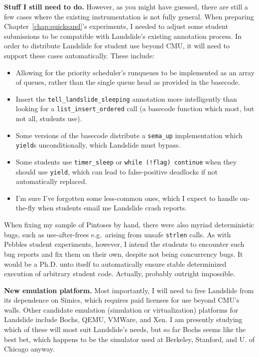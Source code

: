 {\bf Stuff I still need to do.}
However, as you might have guessed, there are still a few cases where the existing instrumentation is not fully general.
When preparing Chapter~\ref{chap:quicksand}'s experiments, I needed to adjust some student submissions to be compatible with Landslide's existing annotation process.
In order to distribute Landslide for student use beyond CMU, it will need to support these cases automatically.
These include:
\begin{itemize}
	\item Allowing for the priority scheduler's runqueues to be implemented as an array of queues, rather than the single queue head as provided in the basecode.
	\item Insert the {\tt tell\_landslide\_sleeping} annotation more intelligently than looking for a {\tt list\_insert\_ordered} call (a basecode function which most, but not all, students use).
	\item Some versions of the basecode distribute a {\tt sema\_up} implementation which {\tt yield}s unconditionally, which Landslide must bypass.
	\item Some students use {\tt timer\_sleep} or {\tt while (!flag) continue} when they should use {\tt yield}, which can lead to false-positive deadlocks if not automatically replaced.
	\item I'm sure I've forgotten some less-common ones, which I expect to handle on-the-fly when students email me Landslide crash reports.
\end{itemize}
When fixing my sample of Pintoses by hand, there were also myriad deterministic bugs, such as use-after-frees e.g.~arising from unsafe {\tt strlen} calls.
As with Pebbles student experiments, however, I intend the students to encounter such bug reports and fix them on their own, despite not being concurrency bugs.
It would be a Ph.D. unto itself to automatically ensure stable determinized execution of arbitrary student code.
Actually, probably outright impossible.

{\bf New emulation platform.}
Most importantly, I will need to free Landslide from its dependence on Simics, which requires paid licenses for use beyond CMU's walls.
Other candidate emulation (simulation or virtualization) platforms for Landslide include Bochs, QEMU, VMWare, and Xen.
I am presently studying which of these will most suit Landslide's needs,
but so far Bochs seems like the best bet, which happens to be the simulator used at Berkeley, Stanford, and U. of Chicago anyway.

